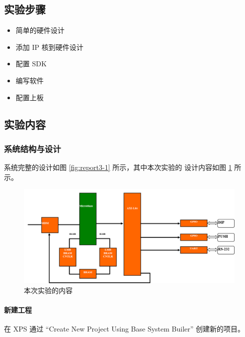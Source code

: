 \documentclass{ctexart}
\begin{document}
        \subsection{实验步骤}
        
        \begin{itemize}
            \item 简单的硬件设计
            \item 添加 IP 核到硬件设计
            \item 配置 SDK
            \item 编写软件
            \item 配置上板
        \end{itemize}

        \subsection{实验内容}

        \subsubsection{系统结构与设计}

        系统完整的设计如图 \ref{fig:report3-1} 所示，其中本次实验的
        设计内容如图 \ref{fig:report3-3} 所示。
      
        \begin{figure}[h!]
          \centering
          \includegraphics[width=1\linewidth]{report3-3}
          \caption{本次实验的内容}
          \label{fig:report3-3}
        \end{figure}
        
        \paragraph{新建工程}
        
        在 XPS 通过 “Create New Project Using Base System Builer” 创建新的项目。
        
\end{document}
